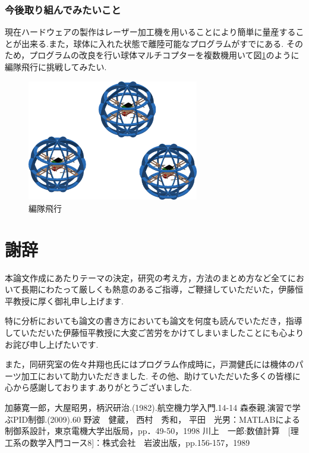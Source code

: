 \documentclass[12pt,oneside]{sotsuken_paper}
\begin{document}
\subsection{今後取り組んでみたいこと}

現在ハードウェアの製作はレーザー加工機を用いることにより簡単に量産することが出来る.また，球体に入れた状態で離陸可能なプログラムがすでにある.
そのため，プログラムの改良を行い球体マルチコプターを複数機用いて図\ref{fig:hen}のように編隊飛行に挑戦してみたい.

\begin{figure}[htbp]
	\begin{center}
		\includegraphics[width=75mm]{image/hen.png}
		\caption{編隊飛行}
		\label{fig:hen}
	\end{center}
\end{figure}


\chapter*{謝辞}
本論文作成にあたりテーマの決定，研究の考え方，方法のまとめ方など全てにおいて長期にわたって厳しくも熱意のあるご指導，ご鞭撻していただいた，伊藤恒平教授に厚く御礼申し上げます.


特に分析においても論文の書き方においても論文を何度も読んでいただき，指導していただいた伊藤恒平教授に大変ご苦労をかけてしまいましたことにも心よりお詫び申し上げたいです.


また，同研究室の佐々井翔也氏にはプログラム作成時に，戸澗健氏には機体のパーツ加工において助力いただきました.
その他、助けていただいた多くの皆様に心から感謝しております.ありがとうございました.

\begin{thebibliography}{8}
	 加藤寛一郎，大屋昭男，柄沢研治.(1982).航空機力学入門.14-14
	 森泰親.演習で学ぶPID制御.(2009).60
	 野波　健蔵， 西村　秀和， 平田　光男：MATLABによる制御系設計，東京電機大学出版局，pp．49-50，1998
	 川上　一郎:数値計算　[理工系の数学入門コース8]：株式会社　岩波出版，pp.156-157，1989
\end{thebibliography}
\end{document}
